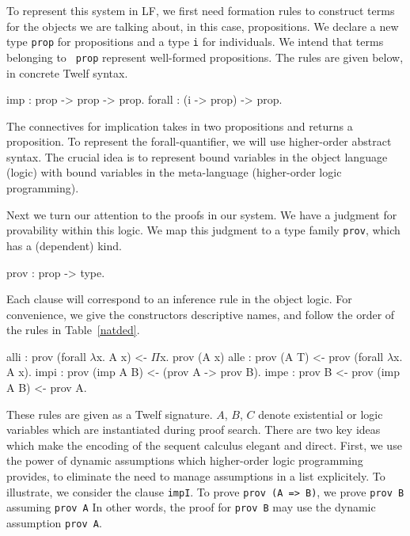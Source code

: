 \documentclass{acmconf}
\newcommand{\z}{\mbox{}}
\begin{document}
To represent this system in LF, we first need formation rules to
construct terms for the objects we are talking about, in this case,
propositions. We declare a new type {\tt prop} for propositions and a
type {\tt i} for individuals. We intend that terms belonging to {\tt
  prop} represent well-formed propositions. The rules are given below,
in concrete Twelf syntax. 


\begin{code}
imp    : prop -> prop -> prop.
forall : (i -> prop) -> prop.
\end{code}

The connectives for implication takes in two propositions and returns a
proposition. To represent the forall-quantifier, we will use
higher-order abstract syntax. The crucial idea is to represent bound
variables in the object language (logic) with bound variables in the
meta-language (higher-order logic programming). 

Next we turn our attention to the proofs in our system. We have a
judgment for provability within this logic. We map this judgment to
a type family {\tt prov}, which has a (dependent) kind.

\begin{code}
prov : prop -> type.
\end{code}

Each clause will correspond to an inference rule in the object
logic. For convenience, we give the constructors 
descriptive names, and follow the order of the rules in
Table~\ref{natded}. 

\begin{code}
alli   : prov (forall $\lambda$x. A x)
            <- $\Pi$x. prov (A x)
alle   : prov (A T)
            <- prov (forall $\lambda$x. A x).
\z
impi     : prov (imp A B)
            <- (prov A -> prov B).
impe     : prov B
            <- prov (imp A B)
            <- prov A.
\end{code}


These rules are given as a Twelf signature. $A$, $B$, $C$ denote
existential or logic variables which are instantiated during proof
search. There are two key ideas which make the encoding of the sequent
calculus elegant and direct. First, we use the power of dynamic
assumptions which higher-order logic programming provides, to
eliminate the need to manage assumptions in a list explicitely. To
illustrate, we consider the clause {\tt impI}. To  prove {\tt prov (A
  => B)}, we prove {\tt prov B} assuming {\tt prov A} In other words,
the proof for {\tt prov B} may use the dynamic assumption {\tt prov A}. 
\end{document}
